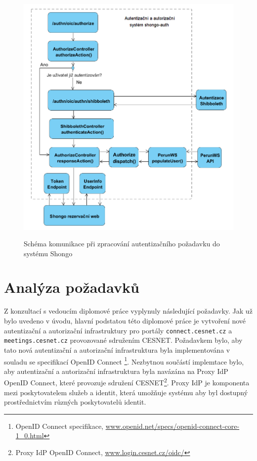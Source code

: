 \documentclass[
  printed, %
  twoside, %
  table,   %
  nolof,     %
  nolot,     %
]{fithesis3}
\begin{document}
\begin{figure}[H]
\caption{Schéma komunikace při zpracování autentizačního požadavku do systému Shongo}
\centering
\includegraphics[width=12.8cm]{pics/shongoAuthSystem} 
\label{fig:shongoAuthnProcess}
\end{figure}
\par 


\section{Analýza požadavků}
Z konzultací s vedoucím diplomové práce vyplynuly následující požadavky. Jak už bylo uvedeno v úvodu, hlavní podstatou této diplomové práce je vytvoření nové autentizační a autorizační infrastruktury pro portály \texttt{connect.cesnet.cz} a \texttt{meetings.cesnet.cz} provozované sdružením CESNET. Požadavkem bylo, aby tato nová autentizační a autorizační infrastruktura byla implementována v souladu se specifikací OpenID Connect  \footnote{OpenID Connect specifikace, \url{www.openid.net/specs/openid-connect-core-1_0.html}}. Nezbytnou součástí implemtace bylo, aby autentizační a autorizační infrastruktura byla navázána na Proxy IdP OpenID Connect, které provozuje sdružení CESNET\footnote{Proxy IdP OpenID Connect, \url{www.login.cesnet.cz/oidc/}}. Proxy IdP je komponenta mezi poskytovatelem služeb a identit, která umožňuje systému aby byl dostupný prostřednictvím různých poskytovatelů identit. \par
\end{document}
